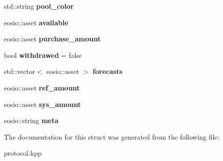 \begin{DoxyCompactItemize}
\item 
\mbox{\label{structeosio_1_1balance_a40ac6d67666369f291630e98870daed3}} 
std\+::string {\bfseries pool\+\_\+color}
\item 
\mbox{\label{structeosio_1_1balance_a6b80456da79deafb97592839001f9e6a}} 
eosio\+::asset {\bfseries available}
\item 
\mbox{\label{structeosio_1_1balance_a61223315ff49034dd597b5ccfe725183}} 
eosio\+::asset {\bfseries purchase\+\_\+amount}
\item 
\mbox{\label{structeosio_1_1balance_afba4dfb4ebe9a129e93b37d6a3907cd7}} 
bool {\bfseries withdrawed} = false
\item 
\mbox{\label{structeosio_1_1balance_afebf2cb5fe118810ab613a08b92f236b}} 
std\+::vector$<$ eosio\+::asset $>$ {\bfseries forecasts}
\item 
\mbox{\label{structeosio_1_1balance_ab04f7ff3b73ba647d8e769206f589722}} 
eosio\+::asset {\bfseries ref\+\_\+amount}
\item 
\mbox{\label{structeosio_1_1balance_a11e2a26a102b4ddc5a88772fb072167f}} 
eosio\+::asset {\bfseries sys\+\_\+amount}
\item 
\mbox{\label{structeosio_1_1balance_a39120187a8d37fad057699d2d971db5d}} 
eosio\+::string {\bfseries meta}
\end{DoxyCompactItemize}


The documentation for this struct was generated from the following file\+:\begin{DoxyCompactItemize}
\item 
protocol.\+hpp\end{DoxyCompactItemize}
